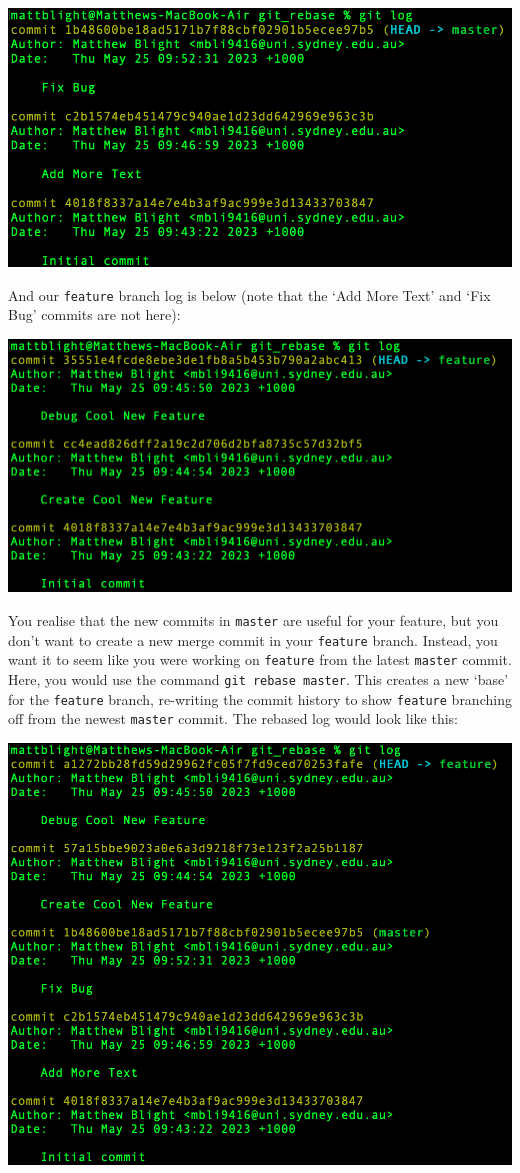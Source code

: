 \documentclass[a4paper, 11pt]{report}
\begin{document}
\includegraphics[width=\textwidth]{rebase1}

And our \verb|feature| branch log is below (note that the ‘Add More Text’ and ‘Fix Bug’ commits are not here):

\includegraphics[width=\textwidth]{rebase2}

You realise that the new commits in \verb|master| are useful for your feature, but you don’t want to create a new merge commit in your \verb|feature| branch. Instead, you want it to seem like you were working on \verb|feature| from the latest \verb|master| commit. Here, you would use the command \verb|git rebase master|. This creates a new ‘base’ for the \verb|feature| branch, re-writing the commit history to show \verb|feature| branching off from the newest \verb|master| commit. The rebased log would look like this:

\includegraphics[width=\textwidth]{rebase3}
\end{document}
